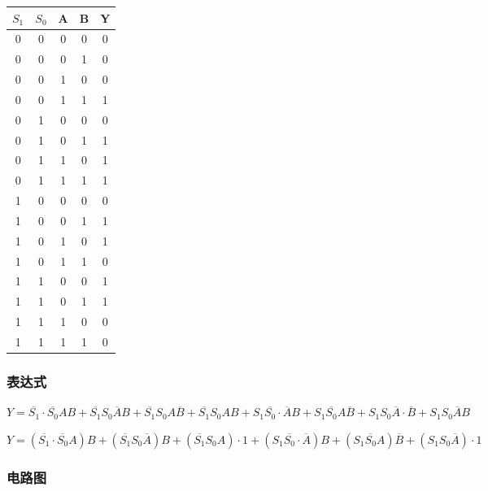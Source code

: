 \documentclass{article}
\begin{document}
\begin{table}[!hbp]
\centering
\begin{tabular}{|c|c|c|c||c|}
\hline
$S_1$ & $S_0$ & A & B & Y \\
\hline
0 & 0 & 0 & 0 & 0 \\
\hline
0 & 0 & 0 & 1 & 0 \\
\hline
0 & 0 & 1 & 0 & 0 \\
\hline
0 & 0 & 1 & 1 & 1 \\
\hline
0 & 1 & 0 & 0 & 0 \\
\hline
0 & 1 & 0 & 1 & 1 \\
\hline
0 & 1 & 1 & 0 & 1 \\
\hline
0 & 1 & 1 & 1 & 1 \\
\hline
1 & 0 & 0 & 0 & 0 \\
\hline
1 & 0 & 0 & 1 & 1 \\
\hline
1 & 0 & 1 & 0 & 1 \\
\hline
1 & 0 & 1 & 1 & 0 \\
\hline
1 & 1 & 0 & 0 & 1 \\
\hline
1 & 1 & 0 & 1 & 1 \\
\hline
1 & 1 & 1 & 0 & 0 \\
\hline
1 & 1 & 1 & 1 & 0 \\
\hline

\end{tabular}
\end{table}

\subsubsection{表达式}

$Y = \overline{S_1} \cdot \overline{S_0} AB + \overline{S_1} S_0 \overline{A} B + \overline{S_1} S_0A \overline{B} + \overline{S_1}S_0AB + S_1 \overline{S_0} \cdot  \overline{A} B + S_1 \overline{S_0}A \overline{B} + S_1S_0 \overline{A} \cdot  \overline{B} + S_1S_0 \overline{A} B$

$Y = (\overline{S_1} \cdot \overline{S_0} A)B + (\overline{S_1} S_0 \overline{A}) B + (\overline{S_1} S_0A) \cdot 1 + (S_1 \overline{S_0} \cdot \overline{A}) B + (S_1 \overline{S_0}A) \overline{B} + (S_1S_0 \overline{A}) \cdot 1$

\newpage

\subsubsection{电路图}
\end{document}
